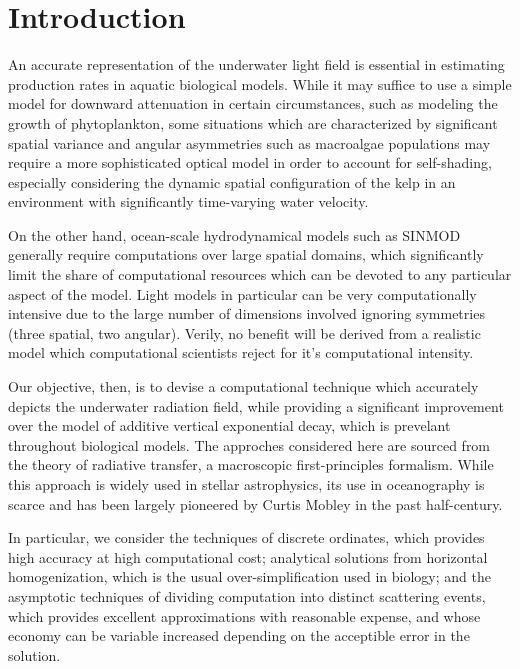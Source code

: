 \documentclass[10pt]{article}
\begin{document}
\section{Introduction}
An accurate representation of the underwater light field is essential in
estimating production rates in aquatic biological models. While it may suffice
to use a simple model for downward attenuation in certain circumstances, such as
modeling the growth of phytoplankton, some situations which are characterized by
significant spatial variance and angular asymmetries such as macroalgae
populations may require a more sophisticated optical model in order to account
for self-shading, especially considering the dynamic spatial configuration of
the kelp in an environment with significantly time-varying water velocity.

On the other hand, ocean-scale hydrodynamical models such as SINMOD generally require
computations over large spatial domains, which significantly limit the share of
computational resources which can be devoted to any particular aspect of the
model. Light models in particular can be very computationally intensive due to
the large number of dimensions involved ignoring symmetries (three spatial, two
angular). Verily, no benefit will be derived from a realistic model which
computational scientists reject for it's computational intensity.

Our objective, then, is to devise a computational technique which accurately
depicts the underwater radiation field, while providing a significant
improvement over the model of additive vertical exponential decay, which is
prevelant throughout biological models. The approches considered here are
sourced from the theory of radiative transfer, a macroscopic first-principles
formalism. While this approach is widely used in stellar astrophysics, its use
in oceanography is scarce and has been largely pioneered by Curtis Mobley in the
past half-century.

In particular, we consider the techniques of discrete ordinates, which provides
high accuracy at high computational cost; analytical solutions from horizontal
homogenization, which is the usual over-simplification used in biology; and the
asymptotic techniques of dividing computation into distinct scattering
events, which provides excellent approximations with reasonable expense, and
whose economy can be variable increased depending on the acceptible error in
the solution.
  
\end{document}
